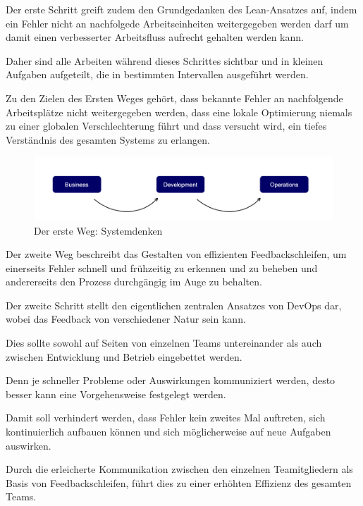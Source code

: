 Der erste Schritt greift zudem den Grundgedanken des Lean-Ansatzes auf, indem ein Fehler nicht an nachfolgede Arbeitseinheiten weitergegeben werden darf um damit einen verbesserter Arbeitsfluss aufrecht gehalten werden kann. \cite[S. 252]{tiemeyer_handbuch_2021}  

Daher sind alle Arbeiten während dieses Schrittes sichtbar und in kleinen Aufgaben aufgeteilt, die in bestimmten Intervallen ausgeführt werden. 

Zu den Zielen des Ersten Weges gehört, dass bekannte Fehler an nachfolgende Arbeitsplätze nicht weitergegeben werden, dass eine lokale Optimierung niemals zu einer globalen Verschlechterung führt und dass versucht wird, ein tiefes Verständnis des gesamten Systems zu erlangen. \cite{kim_three_2012}  

\begin{figure}[h]
    \centering
    \includegraphics[scale=0.6]{Bilder/First Way.png}
    \caption{Der erste Weg: Systemdenken \cite{kim_three_2012}}
\end{figure}

Der zweite Weg beschreibt das Gestalten von effizienten Feedbackschleifen, um einerseits Fehler schnell und frühzeitig zu erkennen und zu beheben und andererseits den Prozess durchgängig im Auge zu behalten.

Der zweite Schritt stellt den eigentlichen zentralen Ansatzes von DevOps dar, wobei das Feedback von verschiedener Natur sein kann. \cite[S. 254]{tiemeyer_handbuch_2021} 

Dies sollte sowohl auf Seiten von einzelnen Teams untereinander als auch zwischen Entwicklung und Betrieb eingebettet werden. \cite[S. 94]{ravichandran_devops_2016}

Denn je schneller Probleme oder Auswirkungen kommuniziert werden, desto besser kann eine Vorgehensweise festgelegt werden. 

Damit soll verhindert werden, dass Fehler kein zweites Mal auftreten, sich kontinuierlich aufbauen können und sich möglicherweise auf neue Aufgaben auswirken. 

Durch die erleicherte Kommunikation zwischen den einzelnen Teamitgliedern als Basis von Feedbackschleifen, führt dies zu einer erhöhten Effizienz des gesamten Teams. 

